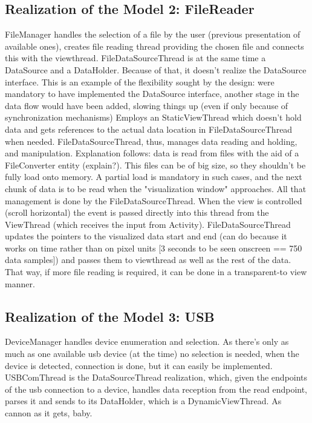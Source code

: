 		\subsection{Realization of the Model 2: FileReader}
			FileManager handles the selection of a file by the user (previous presentation of available ones), creates file reading thread providing the chosen file and connects this with the viewthread.
			FileDataSourceThread is at the same time a DataSource and a DataHolder. Because of that, it doesn't realize the DataSource interface. This is an example of the flexibility sought by the design: were mandatory to have implemented the DataSource interface, another stage in the data flow would have been added, slowing things up (even if only because of synchronization mechanisms)
			Employs an StaticViewThread which doesn't hold data and gets references to the actual data location in FileDataSourceThread when needed. 
			FileDataSourceThread, thus, manages data reading and holding, and manipulation. Explanation follows: data is read from files with the aid of a FileConverter entity (explain?). This files can be of big size, so they shouldn't be fully load onto memory. A partial load is mandatory in such cases, and the next chunk of data is to be read when the "visualization window" approaches. All that management is done by the FileDataSourceThread. When the view is controlled (scroll horizontal) the event is passed directly into this thread from the ViewThread (which receives the input from Activity). FileDataSourceThread updates the pointers to the visualized data start and end (can do because it works on time rather than on pixel units [3 seconds to be seen onscreen == 750 data samples]) and passes them to viewthread as well as the rest of the data. That way, if more file reading is required, it can be done in a transparent-to view manner.

		\subsection{Realization of the Model 3: USB}
			DeviceManager handles device enumeration and selection. As there's only as much as one available usb device (at the time) no selection is needed, when the device is detected, connection is done, but it can easily be implemented.
			USBComThread is the DataSourceThread realization, which, given the endpoints of the usb connection to a device, handles data reception from the read endpoint, parses it and sends to its DataHolder, which is a DynamicViewThread. As cannon as it gets, baby.

